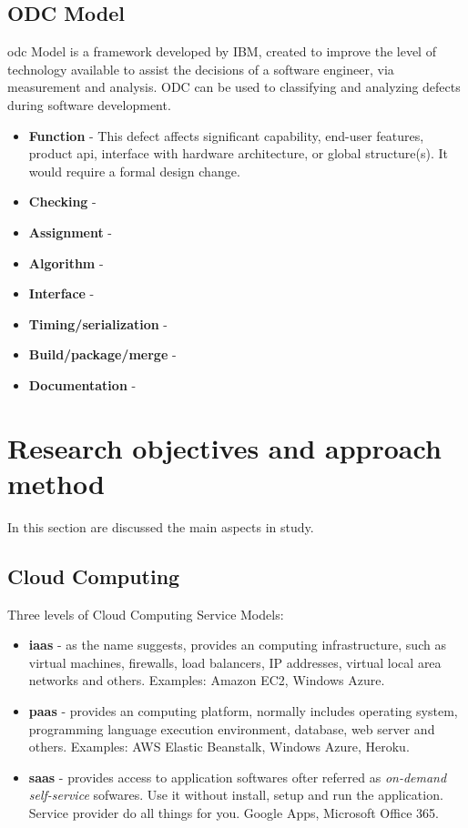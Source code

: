 \subsection{ODC Model}
\ac{odc} Model is a framework developed by IBM, created to improve the level of technology available to assist the decisions of a software engineer, via measurement and analysis.
ODC can be used to classifying and analyzing defects during software development.

\cite{bridge1998orthogonal}
\cite{chillarege2004orthogonal}

\begin{itemize}
	\item \textbf{Function} - This defect affects significant capability, end-user features, product \ac{api}, interface with hardware architecture, or global structure(s). It would require a formal design change.
	\item \textbf{Checking} -
	\item \textbf{Assignment} -
	\item \textbf{Algorithm} -
	\item \textbf{Interface} -
	\item \textbf{Timing/serialization} -
	\item \textbf{Build/package/merge} -
	\item \textbf{Documentation} -
\end{itemize}


\newpage
\section{Research objectives and approach method}

In this section are discussed the main aspects in study.

\subsection{Cloud Computing}

Three levels of Cloud Computing Service Models:

\begin{itemize}
	\item \textbf{\ac{iaas}} - as the name suggests, provides an computing infrastructure, such as virtual machines, firewalls, load balancers, IP addresses, virtual local area networks and others. Examples: Amazon EC2, Windows Azure.

	\item \textbf{\ac{paas}} - provides an computing platform, normally includes operating system, programming language execution environment, database, web server and others. Examples: AWS Elastic Beanstalk, Windows Azure, Heroku.

	\item \textbf{\ac{saas}} - provides access to application softwares ofter referred as \textit{on-demand self-service} sofwares. Use it without install, setup and run the application. Service provider do all things for you. Google Apps, Microsoft Office 365.

\end{itemize}

